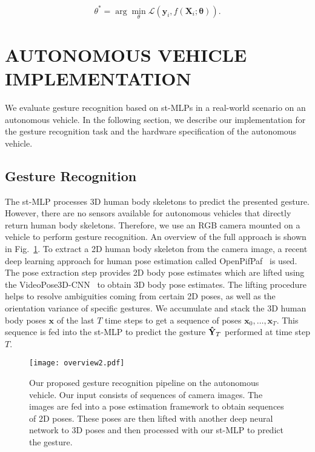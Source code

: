 \documentclass[letterpaper, 10 pt, conference]{ieeeconf}
\begin{document}
\begin{equation}
    \theta^{*} = \arg\min_{\theta}  \mathcal{L}(\mathbf{y}_{i}, f(\mathbf{X}_{i};\mathbf{\theta})).
\end{equation}


\section{AUTONOMOUS VEHICLE IMPLEMENTATION}
\label{sec:_auton_car_impl}

We evaluate gesture recognition based on st-MLPs in a real-world scenario on an autonomous vehicle. In the following section, we describe our implementation for the gesture recognition task and the hardware specification of the autonomous vehicle.

\subsection{Gesture Recognition}
\label{subsec:gesture_recognition}
The st-MLP processes 3D human body skeletons to predict the presented gesture. However, there are no sensors available for autonomous vehicles that directly return human body skeletons. Therefore, we use an RGB camera mounted on a vehicle to perform gesture recognition. An overview of the full approach is shown in Fig.~\ref{fig:real_world_demo}. To extract a 2D human body skeleton from the camera image, a recent deep learning approach for human pose estimation called OpenPifPaf~\cite{Kreiss_2019_CVPR} is used. The pose extraction step provides 2D body pose estimates which are lifted using the VideoPose3D-CNN~\cite{pavllo:videopose3d:2019} to obtain 3D body pose estimates. The lifting procedure helps to resolve ambiguities coming from certain 2D poses, as well as the orientation variance of specific gestures. We accumulate and stack the 3D human body poses $\mathbf{x}$ of the last $T$ time steps to get a sequence of poses $\mathbf{x}_{0}, \dots, \mathbf{x}_{T}$. This sequence is fed into the st-MLP to predict the gesture $\mathbf{\Hat{Y}}_{T}$ performed at time step $T$.

\begin{figure}
    \vspace{2mm}
    \centering
    \texttt{[image: overview2.pdf]}
    \caption{Our proposed gesture recognition pipeline on the autonomous vehicle. Our input consists of sequences of camera images. The images are fed into a pose estimation framework to obtain sequences of 2D poses. These poses are then lifted with another deep neural network to 3D poses and then processed with our st-MLP to predict the gesture.}
    \label{fig:real_world_demo}
\end{figure}
\end{document}
